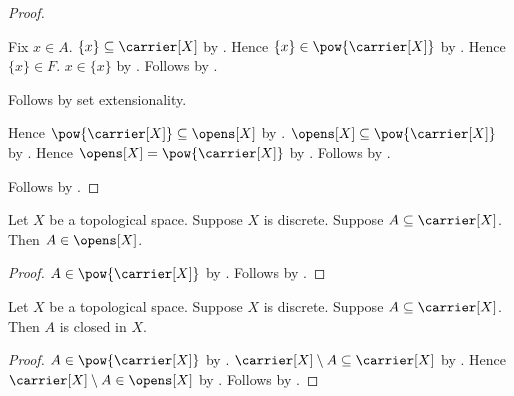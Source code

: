 \begin{proof}
\begin{subproof}
\begin{subproof}
\begin{subproof}
                \begin{subproof}
                    Fix $x\in A$.
                    $\{x\}\subseteq\carrier[X]$
                        by .
                    Hence $\{x\}\in\pow{\carrier[X]}$
                        by .
                    Hence $\{x\}\in F$.
                    $x\in\{x\}$ by .
                    Follows by .
                \end{subproof}
                Follows by set extensionality.
            \end{subproof}
        \end{subproof}
        Hence $\pow{\carrier[X]}\subseteq\opens[X]$ by .
        $\opens[X]\subseteq\pow{\carrier[X]}$ by .
        Hence $\opens[X]=\pow{\carrier[X]}$
            by .
        Follows by .
    \end{subproof}
    Follows by \auto.
\end{proof}

\begin{proposition}\label{every_subset_open_in_discrete_space}
    Let $X$ be a topological space.
    Suppose $X$ is discrete.
    Suppose $A\subseteq\carrier[X]$.
    Then $A\in\opens[X]$.
\end{proposition}
\begin{proof}
    $A\in\pow{\carrier[X]}$ by .
    Follows by .
\end{proof}

\begin{proposition}\label{every_subset_closed_in_discrete_space}
    Let $X$ be a topological space.
    Suppose $X$ is discrete.
    Suppose $A\subseteq\carrier[X]$.
    Then $A$ is closed in $X$.
\end{proposition}
\begin{proof}
    $A\in\pow{\carrier[X]}$ by .
    $\carrier[X]\setminus A\subseteq\carrier[X]$
        by .
    Hence $\carrier[X]\setminus A\in\opens[X]$
        by .
    Follows by .
\end{proof}

